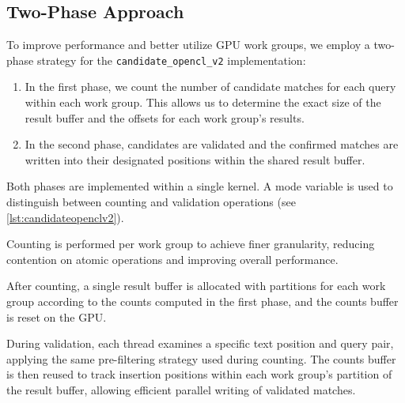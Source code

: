 \documentclass{article}
\begin{document}
    \subsection{Two-Phase Approach}
    To improve performance and better utilize GPU work groups, we employ a two-phase strategy for the \texttt{candidate\_opencl\_v2} implementation:
    \begin{enumerate}
        \item In the first phase, we count the number of candidate matches for each query within each work group.
        This allows us to determine the exact size of the result buffer and the offsets for each work group's results.
        \item In the second phase, candidates are validated and the confirmed matches are written into their designated positions within the shared result buffer.
    \end{enumerate}

    Both phases are implemented within a single kernel.
    A mode variable is used to distinguish between counting and validation operations (see \autoref{lst:candidateopenclv2}).

    Counting is performed per work group to achieve finer granularity, reducing contention on atomic operations and improving overall performance.

    After counting, a single result buffer is allocated with partitions for each work group according to the counts computed in the first phase, and the counts buffer is reset on the GPU\@.

    During validation, each thread examines a specific text position and query pair, applying the same pre-filtering strategy used during counting.
    The counts buffer is then reused to track insertion positions within each work group's partition of the result buffer, allowing efficient parallel writing of validated matches.
\end{document}
